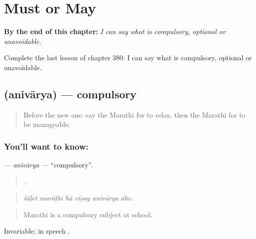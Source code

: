 
\chapter{Must or May}
\label{ch:mr-must-or-may}

\begin{chapteropening}
\textbf{By the end of this chapter:} \emph{I can say what is compulsory, optional or unavoidable.}

Complete the last lesson of chapter 380: I can say what is compulsory, optional or unavoidable.
\end{chapteropening}

\section[\texorpdfstring{\mr{अनिवार्य} (anivārya)}{अनिवार्य (anivārya)}]{ (anivārya) — compulsory}

\label{lesson:MR-C380-anivarya}



\begin{quote}
Before the new one: say the Marathi for to relax, then the Marathi for to be manageable.
\end{quote}

\subsection*{You'll want to know: }
\textbf{} — \emph{anivārya} — \textquotedblleft{}compulsory\textquotedblright{}.

\begin{quote}
     .
\end{quote}

\begin{quote}
\emph{śāḷet marāṭhī hā viṣay anivārya āhe.}
\end{quote}

\begin{quote}
Marathi is a compulsory subject at school.
\end{quote}

Invariable; in speech .

